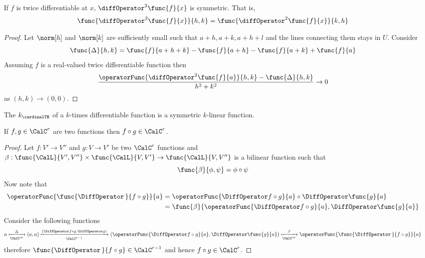 \begin{theorem}
    If \(f\) is twice differentiable at \(x\), \(\diffOperator^2 \func{f}{x}\) is symmetric. That is,
    \begin{equation*}
        \func{\diffOperator^2 \func{f}{x}}{h,k} = \func{\diffOperator^2 \func{f}{x}}{k,h}
    \end{equation*}
\end{theorem}

\begin{proof}
    Let \(\norm[h]\) and \(\norm[k]\) are sufficiently small such that \(a + h, a+  k , a+ h + l\) and the lines connecting them stays in \(U\). Consider
    \begin{equation*}
        \func{\Delta}{h,k} = \func{f}{a + h + k} - \func{f}{a + h} - \func{f}{a  + k} + \func{f}{a }
    \end{equation*}
    Assuming \(f\) is a real-valued twice differentiable function then
    \begin{equation*}
        \dfrac{\operatorFunc{\diffOperator^2 \func{f}{a}}{h,k} - \func{\Delta}{h,k}}{h^2 + k^2} \to 0
    \end{equation*}
    as \((h,k) \to (0,0)\).
\end{proof}

\begin{theorem}
    The \(k_\cardinalTH\) of a \(k\)-times differentiable function is a symmetric \(k\)-linear function.
\end{theorem}
\begin{proposition}
    If \(f,g \in \CalC^r\) are two functions then \(f \circ g \in \CalC^r\).
\end{proposition}

\begin{proof}
    Let \(f: V' \to V''\) and \(g: V \to V'\) be two \(\CalC^r\) functions and  \(\beta : \func{\CalL}{V',V''} \times \func{\CalL}{V,V'} \to \func{\CalL}{V,V''}\) is a bilinear function such that
    \begin{equation*}
        \func{\beta}{\phi,\psi} = \phi \circ \psi
    \end{equation*}
    Now note that
    \begin{align*}
        \operatorFunc{\func{\DiffOperator \,}{ f \circ g}}{a} & = \operatorFunc{\DiffOperator f \circ g}{a}\circ \DiffOperator \func{g}{a}            \\
                                                              & = \func{\beta }{\operatorFunc{\DiffOperator f \circ g}{a}, \DiffOperator \func{g}{a}}
    \end{align*}
    Consider the following functions
    \begin{equation*}
        a \xmapsto[\CalC^\infty]{\Delta} (a,a) \xmapsto[\CalC^{r-1}]{(\DiffOperator f \circ g, \DiffOperator g)} (\operatorFunc{\DiffOperator f \circ g}{a}, \DiffOperator \func{g}{a}) \xmapsto[\CalC^\infty]{\beta}  \operatorFunc{\func{\DiffOperator \,}{ f \circ g}}{a}
    \end{equation*}
    therefore \(\func{\DiffOperator \,}{ f \circ g} \in \CalC^{r-1}\) and hence \(f \circ g \in \CalC^{r}\).
\end{proof}


